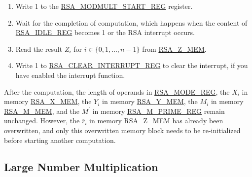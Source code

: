 \documentclass[main\_\_EN.tex]{subfiles}
\begin{document}
\begin{enumerate}
        Users need to write data to each memory block only according to the length of the number; data beyond this length are ignored.

    \item Write 1 to the \hyperref[regdesc:RSAMODMULTSTARTREG]{RSA\_MODMULT\_START\_REG} register.

    \item Wait for the completion of computation, which happens when the content of \hyperref[regdesc:RSAIDLEREG]{RSA\_IDLE\_REG} becomes 1 or the RSA interrupt occurs.

    \item Read the result \begin{math}Z_{i}\end{math} for \begin{math}i \in \{ 0, 1, \dots, n-1 \} \end{math} from \hyperref[regdesc:RSAmemory]{RSA\_Z\_MEM}.
    \item Write 1 to \hyperref[regdesc:RSACLEARINTERRUPTREG]{RSA\_CLEAR\_INTERRUPT\_REG} to clear the interrupt, if you have enabled the interrupt function.

\end{enumerate}

After the computation, the length of operands in \hyperref[regdesc:RSAMODEXPMODEREG]{RSA\_MODE\_REG}, the \begin{math}X_{i}\end{math} in memory \hyperref[regdesc:RSAmemory]{RSA\_X\_MEM}, the \begin{math}Y_{i}\end{math} in memory \hyperref[regdesc:RSAmemory]{RSA\_Y\_MEM}, the \begin{math}M_{i}\end{math} in memory \hyperref[regdesc:RSAmemory]{RSA\_M\_MEM}, and the \begin{math}M^{\prime}\end{math} in memory \hyperref[regdesc:RSAMPRIMEREG]{RSA\_M\_PRIME\_REG} remain unchanged. However, the \begin{math}\overline{r}_{i}\end{math} in memory \hyperref[regdesc:RSAmemory]{RSA\_Z\_MEM} has already been overwritten, and only this overwritten memory block needs to be re-initialized before starting another computation.

\subsection{Large Number Multiplication}
\end{document}
